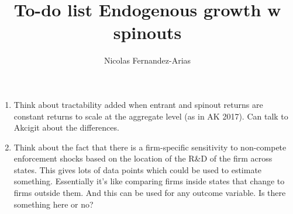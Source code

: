 \documentclass[11pt,english]{article}
\theoremstyle{remark}
\begin{document}
	
\title{To-do list Endogenous growth w spinouts}
\author{Nicolas Fernandez-Arias}
\maketitle


\begin{enumerate}
	\item Think about tractability added when entrant and spinout returns are constant returns to scale at the aggregate level (as in AK 2017). Can talk to Akcigit about the differences.
	\item Think about the fact that there is a firm-specific sensitivity to non-compete enforcement shocks based on the location of the R\&D of the firm across states. This gives lots of data points which could be used to estimate something. Essentially it's like comparing firms inside states that change to firms outside them. And this can be used for any outcome variable. Is there something here or no?
\end{enumerate}
\end{document}
